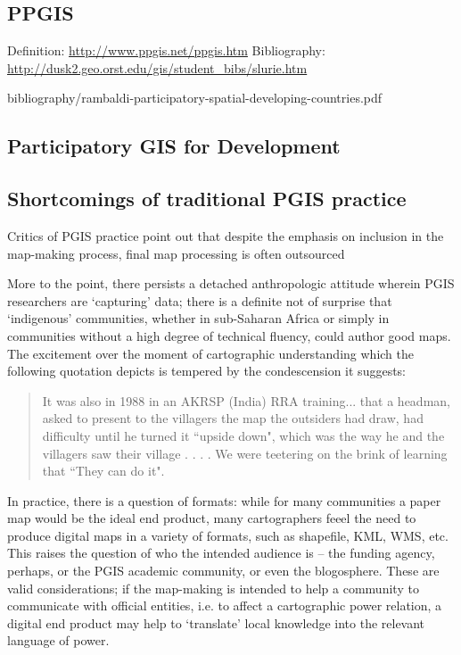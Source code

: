 \documentclass[11pt]{report}
\begin{document}
\subsection{PPGIS}

Definition: \url{http://www.ppgis.net/ppgis.htm}
Bibliography: \url{http://dusk2.geo.orst.edu/gis/student_bibs/slurie.htm}


bibliography/rambaldi-participatory-spatial-developing-countries.pdf

\subsection{Participatory GIS for Development}
\subsection{Shortcomings of traditional PGIS practice}

Critics of PGIS practice point out that despite the emphasis on inclusion in the map-making process, final map processing is often outsourced

More to the point, there persists a detached anthropologic attitude wherein PGIS researchers are `capturing' data; there is a definite not of surprise that `indigenous' communities, whether in sub-Saharan Africa or simply in communities without a high degree of technical fluency, could author good maps. The excitement over the moment of cartographic understanding which the following quotation depicts is tempered by the condescension it suggests: 

\begin{quote}
It was also in 1988 in an AKRSP (India) RRA training... that a headman, asked to present to the villagers the map the outsiders had draw, had difficulty until he turned it ``upside down", which was the way he and the villagers saw their village . . . . We were teetering on the brink of learning that ``They can do it".
\cite{chambers2006participatory}
\end{quote}

In practice, there is a question of formats: while for many communities a paper map would be the ideal end product, many cartographers feeel the need to produce digital maps in a variety of formats, such as shapefile, KML, WMS, etc. This raises the question of who the intended audience is -- the funding agency, perhaps, or the PGIS academic community, or even the blogosphere. These are valid considerations; if the map-making is intended to help a community to communicate with official entities, i.e. to affect a cartographic power relation, a digital end product may help to `translate' local knowledge into the relevant language of power. 
\end{document}
